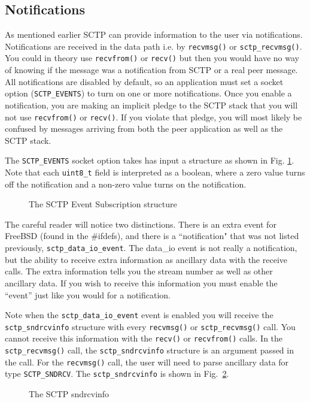 \documentclass[conference]{IEEEtran}
\begin{document}
\subsection{Notifications}

As mentioned earlier SCTP can provide information to the user via
notifications. Notifications are received in the data path i.e. by \texttt{recvmsg()} or \texttt{sctp\_recvmsg()}. You could in theory use \texttt{recvfrom()} or \texttt{recv()} but then you would have no way of knowing if
the message was a notification from SCTP or a real peer message.  All notifications are disabled by default, so
an application must set a socket option (\texttt{SCTP\_EVENTS}) to turn on one or more notifications. Once you 
enable a notification, you are making an implicit pledge to the SCTP stack that you will not use \texttt{recvfrom()} or \texttt{recv()}.
If you violate that pledge, you will most likely be confused by messages arriving from both the peer application as well as the SCTP stack.

The \texttt{SCTP\_EVENTS} socket option takes has input a structure as shown
in Fig. \ref{fig:events}. Note that each \texttt{uint8\_t} field
is interpreted as a boolean, where a zero value turns off the 
notification and a non-zero value turns on the notification.
\begin{figure}

\caption{The SCTP Event Subscription structure}
\label{fig:events}
\end{figure}

The careful reader will notice two distinctions. There is an extra event
for FreeBSD (found in the \#ifdefs), and there is a ``notification" that was 
not listed previously, \texttt{sctp\_data\_io\_event}. The data\_io event is not really a 
notification, but the ability to receive extra information as ancillary data with the receive calls.
The extra information tells you the stream number as well as other
ancillary data. If you wish to receive this information you must enable
the ``event'' just like you would for a notification. 

Note when the \texttt{sctp\_data\_io\_event} event is enabled you will receive the \texttt{sctp\_sndrcvinfo}
structure with every 
\texttt{recvmsg()} or \texttt{sctp\_recvmsg()} call. You cannot receive
this information with the \texttt{recv()} or \texttt{recvfrom()} calls. In the
\texttt{sctp\_recvmsg()} call, the \texttt{sctp\_sndrcvinfo}  structure is an
argument passed in the call. For the \texttt{recvmsg()} call, the user will
need to parse ancillary data for type \texttt{SCTP\_SNDRCV}. 
The \texttt{sctp\_sndrcvinfo} is shown in Fig.~\ref{fig:sndrcv}.
\begin{figure}

\caption{The SCTP sndrcvinfo}
\label{fig:sndrcv}
\end{figure}
\end{document}
